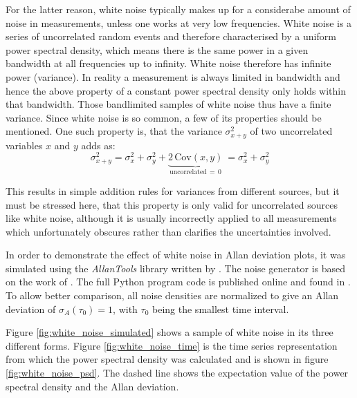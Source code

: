 For the latter reason, white noise typically makes up for a considerabe amount of noise in measurements, unless one works at very low frequencies. White noise is a series of uncorrelated random events and therefore characterised by a uniform power spectral density, which means there is the same power in a given bandwidth at all frequencies up to infinity. White noise therefore has infinite power (variance). In reality a measurement is always limited in bandwidth and hence the above property of a constant power spectral density only holds within that bandwidth. Those bandlimited samples of white noise thus have a finite variance.
Since white noise is so common, a few of its properties should be mentioned. One such property is, that the variance $\sigma_{x+y}^2$ of two uncorrelated variables $x$ and $y$ adds as:
\begin{equation}
    \sigma_{x+y}^2  = \sigma_x^2 + \sigma_y^2 + \underbrace{2\,\mathrm{Cov}(x,y)}_{\text{uncorrelated}\, =\, 0}\ = \sigma_x^2 + \sigma_y^2 \label{eqn:adding_white_noise}
\end{equation}

This results in simple addition rules for variances from different sources, but it must be stressed here, that this property is only valid for uncorrelated sources like white noise, although it is usually incorrectly applied to all measurements which unfortunately obscures rather than clarifies the uncertainties involved.

In order to demonstrate the effect of white noise in Allan deviation plots, it was simulated using the \textit{AllanTools} library written by \citeauthor{allantools} \cite{allantools}. The noise generator is based on the work of \citeauthor{noise_generation} \cite{noise_generation}. The full Python program code is published online \cite{supplemental_material} and found in . To allow better comparison, all noise densities are normalized to give an Allan deviation of $\sigma_A(\tau_0)=1$, with $\tau_0$ being the smallest time interval.

Figure \ref{fig:white_noise_simulated} shows a sample of white noise in its three different forms. Figure \ref{fig:white_noise_time} is the time series representation from which the power spectral density was calculated and is shown in figure \ref{fig:white_noise_psd}. The dashed line shows the expectation value of the power spectral density and the Allan deviation.

